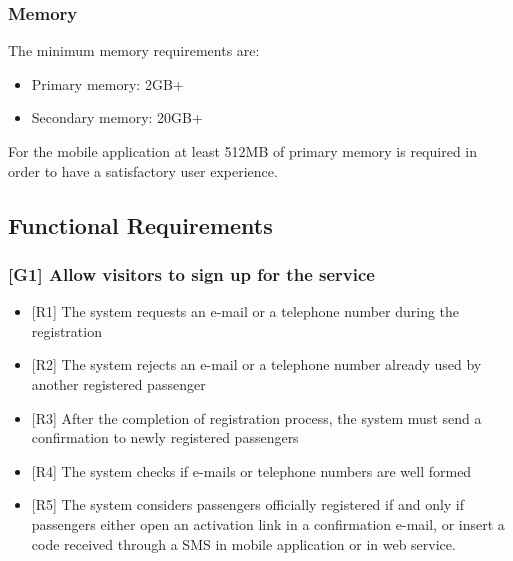 \documentclass[a4paper,12pt]{article}%
\begin{document}
\subsubsection{Memory}
The minimum memory requirements are:
\begin{itemize}
\item Primary memory: 2GB+
\item Secondary memory: 20GB+
\end{itemize}
For the mobile application at least 512MB of primary memory is required in order to have a satisfactory user experience.
\subsection{Functional Requirements}
\subsubsection{{[}G1{]} Allow visitors to sign up for the service}
\label{goal1}
\begin{itemize}
\item {[}R1{]} The system requests an e-mail or a telephone number during the registration
\item {[}R2{]} The system rejects an e-mail or a telephone number already used by another registered passenger
\item {[}R3{]} After the completion of registration process, the system must send a confirmation to newly registered passengers
\item {[}R4{]} The system checks if e-mails or telephone numbers are well formed
\item {[}R5{]} The system considers passengers officially registered if and only if passengers either open an activation link in a confirmation e-mail, or insert a code received through a SMS in mobile application or in web service.
\end{itemize}
\end{document}
